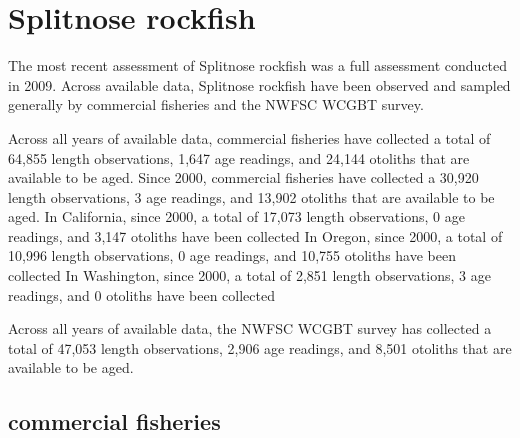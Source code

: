 \documentclass[11pt,
  english,
  letterpaper,
]{article}
\begin{document}
\hypertarget{splitnose-rockfish}{%
\section{Splitnose rockfish}\label{splitnose-rockfish}}

\leavevmode\tagmcend\tagstructend


The most recent assessment of Splitnose rockfish was a full assessment conducted in 2009. Across available data, Splitnose rockfish have been observed and sampled generally by commercial fisheries and the NWFSC WCGBT survey.

\leavevmode\tagmcend\tagstructend\par


Across all years of available data, commercial fisheries have collected a total of 64,855 length observations, 1,647 age readings, and 24,144 otoliths that are available to be aged. Since 2000, commercial fisheries have collected a 30,920 length observations, 3 age readings, and 13,902 otoliths that are available to be aged. In California, since 2000, a total of 17,073 length observations, 0 age readings, and 3,147 otoliths have been collected In Oregon, since 2000, a total of 10,996 length observations, 0 age readings, and 10,755 otoliths have been collected In Washington, since 2000, a total of 2,851 length observations, 3 age readings, and 0 otoliths have been collected

\leavevmode\tagmcend\tagstructend\par


Across all years of available data, the NWFSC WCGBT survey has collected a total of 47,053 length observations, 2,906 age readings, and 8,501 otoliths that are available to be aged.

\leavevmode\tagmcend\tagstructend\par


\hypertarget{commercial-fisheries-51}{%
\subsection{commercial fisheries}\label{commercial-fisheries-51}}

\leavevmode\tagmcend\tagstructend
\end{document}
